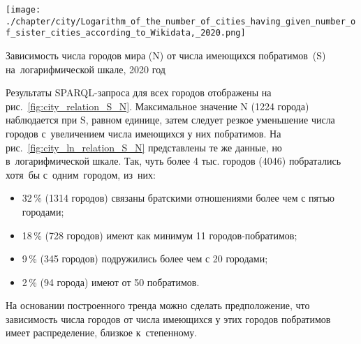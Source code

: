 \begin{marginfigure}[8pt]
    \texttt{[image: ./chapter/city/Logarithm\_of\_the\_number\_of\_cities\_having\_given\_number\_of\_sister\_cities\_according\_to\_Wikidata,\_2020.png]}%
    \vspace{-18pt}
    \caption[Зависимость числа городов от числа имеющихся побратимов на логарифмической шкале, 2020 год.]
    {Зависимость числа городов мира (N) от числа имеющихся побратимов~(S) на~логарифмической шкале, 2020 год}%
\label{fig:city_ln_relation_S_N}%
\end{marginfigure}

Результаты SPARQL-запроса для всех городов отображены на рис.~\ref{fig:city_relation_S_N}. 
Максимальное значение N (\num{1224} города) наблюдается при S, равном единице, 
затем следует резкое уменьшение числа городов с~увеличением числа имеющихся у них побратимов. 
На рис.~\ref{fig:city_ln_relation_S_N} представлены те же данные, но в~логарифмической шкале. 
Так, чуть более 4 тыс. городов (\num{4046}) побратались хотя~бы с~одним~городом, из~них:
%
\begin{itemize}
\item 32\,\% (\num{1314} городов) связаны братскими отношениями более чем с пятью городами;
\item 18\,\% (728 городов) имеют как минимум 11 городов-побратимов;
\item 9\,\% (345 городов) подружились более чем с 20 городами;
\item 2\,\% (94 города) имеют от 50 побратимов.
\end{itemize}

На основании построенного тренда можно сделать предположение, 
что зависимость числа городов от числа имеющихся у этих городов побратимов 
имеет распределение, близкое к~степенному.

%

